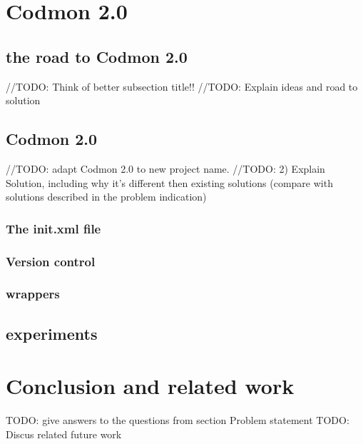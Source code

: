 \documentclass[a4paper,10pt]{scrartcl}
\newcommand{\project}{Codmon 2.0}
\begin{document}
\newpage
\section{\project{}}
\label{sec:Codmon2.0}

\subsection{the road to \project{}}
//TODO: Think of better subsection title!!
//TODO: Explain ideas and road to solution

\subsection{Codmon 2.0}
//TODO: adapt Codmon 2.0 to new project name.
//TODO: 2) Explain Solution, including why it's different then existing solutions (compare with solutions described in the problem indication)

\subsubsection{The init.xml file}
\label{subsec:init}

\subsubsection{Version control}
\label{subsec:versionControl}

\subsubsection{wrappers}
\label{subsec:wrappers}

\subsection{experiments}
\label{sec:experiments}

\newpage

\section{Conclusion and related work}
\label{sec:conclusion}
TODO: give answers to the questions from section Problem statement
TODO: Discus related future work
\newpage


\end{document}
